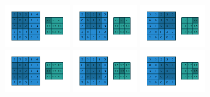 \begin{figure}[ht]
     \begin{subfigure}[b]{0.8\textwidth}
        \centering
        \includegraphics[width=0.32\textwidth]{chapters/assets/avg-pooling/numerical_average_pooling_00.pdf}
        \includegraphics[width=0.32\textwidth]{chapters/assets/avg-pooling/numerical_average_pooling_01.pdf}
        \includegraphics[width=0.32\textwidth]{chapters/assets/avg-pooling/numerical_average_pooling_02.pdf}
        \includegraphics[width=0.32\textwidth]{chapters/assets/avg-pooling/numerical_average_pooling_03.pdf}
        \includegraphics[width=0.32\textwidth]{chapters/assets/avg-pooling/numerical_average_pooling_04.pdf}
        \includegraphics[width=0.32\textwidth]{chapters/assets/avg-pooling/numerical_average_pooling_05.pdf}

\end{subfigure}
\end{figure}
